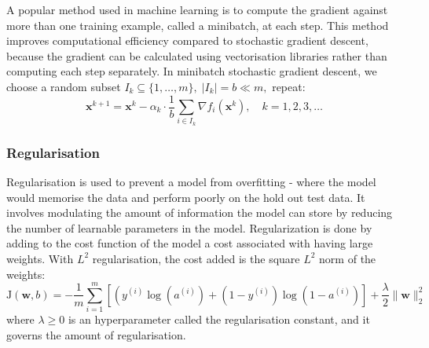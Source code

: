 \documentclass{beamer}
\begin{document}
\begin{frame}[allowframebreaks]
A popular method used in machine learning is to compute the gradient against more than one training example, called a minibatch, at each step. This method improves computational efficiency compared to stochastic gradient descent, because the gradient can be calculated using vectorisation libraries rather than computing each step separately. In minibatch stochastic gradient descent,  we choose a random subset $I_{k} \subseteq\{1, \ldots, m\},\;\left|I_{k}\right|=b \ll m,$ repeat:
\begin{equation}\label{eqn:mini_sgd}
\bm{x}^{k+1}=\bm{x}^{k}- \alpha_k \cdot \frac{1}{b} \sum_{i \in I_{k}} \nabla f_{i}\left(\bm{x}^{k}\right), \quad k=1,2,3, \ldots
\end{equation}
\end{frame}

\begin{frame}
\frametitle{Regularisation}
Regularisation is used to prevent a model from overfitting - where the model would memorise the data and perform poorly on the hold out test data. It involves modulating the amount of information the model can store by reducing the number of learnable parameters in the model. Regularization is done by adding to the cost function of the model a cost associated with having large weights. With $L^2$ regularisation, the cost added is the square $L^2$ norm of the weights: 
\begin{equation}\label{eqn:cost_regularisation}
\mathrm{J}(\bm{w}, b) =-\frac{1}{m} \sum_{i=1}^{m}\left[\left(y^{(i)} \log \left(a^{(i)}\right)+\left(1-y^{(i)}\right) \log \left(1-a^{(i)}\right)\right]\right. + \frac{\lambda}{2}\|\bm{w}\|_2^2
\end{equation}
where $\lambda\geq 0$ is an hyperparameter called the regularisation constant, and it governs the amount of regularisation.
\end{frame}
\end{document}
